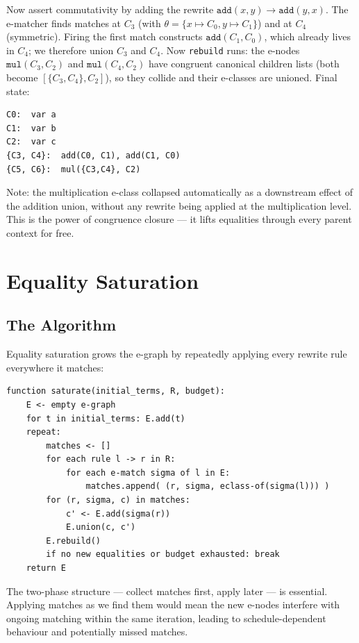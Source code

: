\documentclass[11pt,a4paper]{article}
\begin{document}
Now assert commutativity by adding the rewrite $\mathtt{add}(x, y) \to \mathtt{add}(y, x)$. The e-matcher finds matches at $C_3$ (with $\theta = \{x \mapsto C_0, y \mapsto C_1\}$) and at $C_4$ (symmetric). Firing the first match constructs $\mathtt{add}(C_1, C_0)$, which already lives in $C_4$; we therefore union $C_3$ and $C_4$. Now \texttt{rebuild} runs: the e-nodes $\mathtt{mul}(C_3, C_2)$ and $\mathtt{mul}(C_4, C_2)$ have congruent canonical children lists (both become $[\{C_3, C_4\}, C_2]$), so they collide and their e-classes are unioned. Final state:

\begin{lstlisting}
C0:  var a
C1:  var b
C2:  var c
{C3, C4}:  add(C0, C1), add(C1, C0)
{C5, C6}:  mul({C3,C4}, C2)
\end{lstlisting}

Note: the multiplication e-class collapsed automatically as a downstream effect of the addition union, without any rewrite being applied at the multiplication level. This is the power of congruence closure --- it lifts equalities through every parent context for free.

\section{Equality Saturation}\label{sec:saturation}

\subsection{The Algorithm}\label{sec:sat-algo}

Equality saturation grows the e-graph by repeatedly applying every rewrite rule everywhere it matches:

\begin{lstlisting}
function saturate(initial_terms, R, budget):
    E <- empty e-graph
    for t in initial_terms: E.add(t)
    repeat:
        matches <- []
        for each rule l -> r in R:
            for each e-match sigma of l in E:
                matches.append( (r, sigma, eclass-of(sigma(l))) )
        for (r, sigma, c) in matches:
            c' <- E.add(sigma(r))
            E.union(c, c')
        E.rebuild()
        if no new equalities or budget exhausted: break
    return E
\end{lstlisting}

The two-phase structure --- collect matches first, apply later --- is essential. Applying matches as we find them would mean the new e-nodes interfere with ongoing matching within the same iteration, leading to schedule-dependent behaviour and potentially missed matches.
\end{document}
